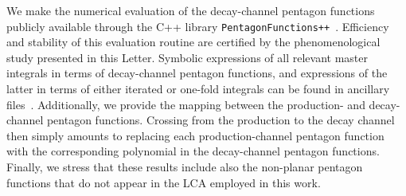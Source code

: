 \documentclass[10pt,aps,prl,superscriptaddress,twocolumn,preprintnumbers,nofootinbib]{revtex4-2}
\begin{document}
We make the numerical evaluation of the decay-channel pentagon functions publicly available through the \textsc{C++} library \texttt{PentagonFunctions++}~\cite{PentagonFunctions}.
Efficiency and stability of this evaluation routine are certified by the phenomenological study presented in this Letter.
Symbolic expressions of all relevant master integrals in terms of decay-channel pentagon functions, and expressions of the latter in terms of either iterated or one-fold integrals can be found in ancillary files~\cite{zenodo}.
Additionally, we provide the mapping between the production- and decay-channel pentagon functions.
Crossing from the production to the decay channel then simply amounts to replacing each production-channel pentagon function with the corresponding polynomial in the decay-channel pentagon functions.
Finally, we stress that these results include also the non-planar pentagon functions that do not appear in the LCA employed in this work.






\end{document}
